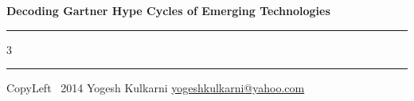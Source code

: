 \documentclass[8pt,landscape]{article}
\begin{document}
\begin{center}
     \Large{\textbf{Decoding Gartner Hype Cycles of Emerging Technologies}}  %
\end{center}
\rule{\linewidth}{0.25pt}
\raggedright
\footnotesize
\begin{multicols}{3}


\rule{0.3\linewidth}{0.25pt}

\scriptsize
CopyLeft \textcopyleft\ 2014 Yogesh Kulkarni
\href{http://www.yogeshkulkarni.com}{yogeshkulkarni@yahoo.com}

\end{multicols}
\end{document}
